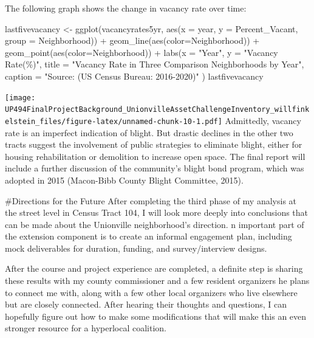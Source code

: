 \documentclass[
]{article}
\newenvironment{Shaded}{\begin{snugshade}}{\end{snugshade}}
\newcommand{\AttributeTok}[1]{\textcolor[rgb]{0.77,0.63,0.00}{#1}}
\newcommand{\FunctionTok}[1]{\textcolor[rgb]{0.00,0.00,0.00}{#1}}
\newcommand{\NormalTok}[1]{#1}
\newcommand{\OtherTok}[1]{\textcolor[rgb]{0.56,0.35,0.01}{#1}}
\newcommand{\SpecialCharTok}[1]{\textcolor[rgb]{0.00,0.00,0.00}{#1}}
\newcommand{\StringTok}[1]{\textcolor[rgb]{0.31,0.60,0.02}{#1}}
\begin{document}
The following graph shows the change in vacancy rate over time:

\begin{Shaded}
\begin{Highlighting}[]
\NormalTok{lastfivevacancy }\OtherTok{\textless{}{-}} \FunctionTok{ggplot}\NormalTok{(vacancyrates5yr, }\FunctionTok{aes}\NormalTok{(}\AttributeTok{x =}\NormalTok{ year, }\AttributeTok{y =}\NormalTok{ Percent\_Vacant, }\AttributeTok{group =}\NormalTok{ Neighborhood)) }\SpecialCharTok{+} 
\FunctionTok{geom\_line}\NormalTok{(}\FunctionTok{aes}\NormalTok{(}\AttributeTok{color=}\NormalTok{Neighborhood)) }\SpecialCharTok{+}
\FunctionTok{geom\_point}\NormalTok{(}\FunctionTok{aes}\NormalTok{(}\AttributeTok{color=}\NormalTok{Neighborhood)) }\SpecialCharTok{+}
\FunctionTok{labs}\NormalTok{(}\AttributeTok{x =} \StringTok{"Year"}\NormalTok{, }\AttributeTok{y =} \StringTok{"Vacancy Rate(\%)"}\NormalTok{,}
     \AttributeTok{title =} \StringTok{"Vacancy Rate in Three Comparison Neighborhoods by Year"}\NormalTok{,}
     \AttributeTok{caption =} \StringTok{"Source: (US Census Bureau: 2016{-}2020)"}\NormalTok{ )}
\NormalTok{lastfivevacancy}
\end{Highlighting}
\end{Shaded}

\texttt{[image: UP494FinalProjectBackground\_UnionvilleAssetChallengeInventory\_willfinkelstein\_files/figure-latex/unnamed-chunk-10-1.pdf]}
Admittedly, vacancy rate is an imperfect indication of blight. But
drastic declines in the other two tracts suggest the involvement of
public strategies to eliminate blight, either for housing rehabilitation
or demolition to increase open space. The final report will include a
further discussion of the community's blight bond program, which was
adopted in 2015 (Macon-Bibb County Blight Committee, 2015).

\#Directions for the Future After completing the third phase of my
analysis at the street level in Census Tract 104, I will look more
deeply into conclusions that can be made about the Unionville
neighborhood's direction. n important part of the extension component is
to create an informal engagement plan, including mock deliverables for
duration, funding, and survey/interview designs.

After the course and project experience are completed, a definite step
is sharing these results with my county commissioner and a few resident
organizers he plans to connect me with, along with a few other local
organizers who live elsewhere but are closely connected. After hearing
their thoughts and questions, I can hopefully figure out how to make
some modifications that will make this an even stronger resource for a
hyperlocal coalition.
\end{document}

